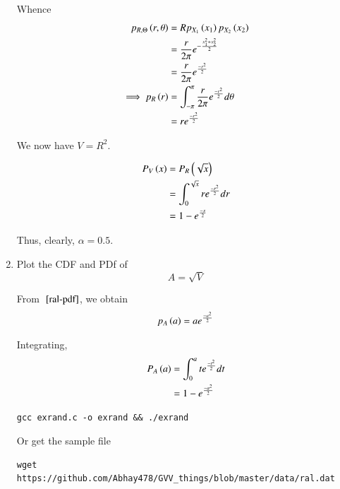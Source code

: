 \documentclass[journal,12pt,twocolumn]{IEEEtran}
\renewcommand\thesection{\arabic{section}}
\theoremstyle{remark}
\numberwithin{equation}{section}
\numberwithin{equation}{section}
\begin{document}
\begin{enumerate}[label=\thesection.\arabic*,ref=\thesection.\theenumi]
Whence
\begin{align}
    \pdf{r, \theta}{R, \Theta} &= R \pdf{x_1}{X_1} \pdf{x_2}{X_2} \nonumber \\
    &= \frac{r}{2 \pi} \e{-\frac{x_1^2 + x_2^2}{2}} \nonumber \\
    &= \frac{r}{2 \pi} \e{\frac{-r^2}{2}} \\
    \implies \pdf{r}{R} &= \int_{-\pi}^\pi \frac{r}{2 \pi} \e{\frac{-r^2}{2}} d\theta \nonumber \\
    &= r \e{\frac{-r^2}{2}} \label{ral-pdf}
\end{align}

We now have $V = R^2$.

\begin{align}
    \cdf{x}{V} &= \cdf{\sqrt{x}}{R} \nonumber \\
    &= \int_0^{\sqrt{x}} r \e{\frac{-r^2}{2}} dr \nonumber \\
    &= 1 - \e{\frac{-x}{2}} 
        \label{alph}
\end{align}


Thus, clearly, $\alpha = 0.5$.

\item
\label{ch3_raleigh_sim}
Plot the CDF and PDf of
%
\begin{equation}
A = \sqrt{V}
\end{equation}

From $~\eqref{ral-pdf}$, we obtain 
\begin{align}
    \pdf{a}{A} = a\e{\frac{-a^2}{2}} 
\end{align}

Integrating,
\begin{align}
    \cdf{a}{A} &= \int_0^a t \e{\frac{-t^2}{2}} dt \nonumber \\
    &= 1 - \e{\frac{-a^2}{2}} \label{ral-cdf}
\end{align}


            
\begin{lstlisting}
gcc exrand.c -o exrand && ./exrand
\end{lstlisting}

Or get the sample file
\begin{lstlisting}
wget https://github.com/Abhay478/GVV_things/blob/master/data/ral.dat
\end{lstlisting}


\end{enumerate}
\end{document}
